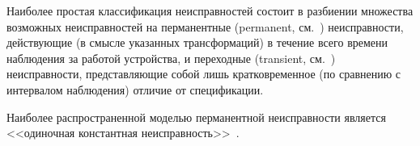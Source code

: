 \begin{multicols}{2}
 Наиболее простая классификация неисправностей состоит в разбиении множества
возможных неисправностей на перманентные (permanent, см.~\cite{1}) неисправности,
действующие (в смысле указанных трансформаций) в течение всего времени
наблюдения за работой устройства, и переходные (transient, см.~\cite{1, 3})
неисправности, представляющие собой лишь кратковременное (по сравнению с
интервалом наблюдения) отличие от спецификации.

 Наиболее распространенной моделью перманентной неисправности является
<<одиночная \mbox{константная} неисправность>>~\cite{8, 9}.
\begin{table*}[b]\small %
\vspace*{6pt}
\begin{center}
\parbox{272pt}{
}

\vspace*{2ex}


\end{center}
\end{table*}
\end{multicols}

